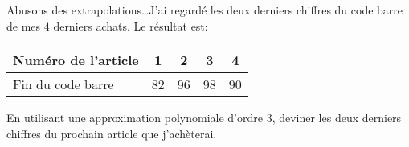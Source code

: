 \begin{exercice}\label{exotestMAT1151-G210003}

	Abusons des extrapolations\ldots J'ai regardé les deux derniers chiffres du code barre de mes $4$ derniers achats. Le résultat est:
	\begin{center}
		\begin{tabular}{|l|c|c|c|c|}
			\hline
			Numéro de l'article	 &	1	&	2	&	3	&	4\\
			\hline
			Fin du code barre	&	82	&	96	&	98	&	90\\
			\hline
		\end{tabular}
	\end{center}
	En utilisant une approximation polynomiale d'ordre $3$, deviner les deux derniers chiffres du prochain article que j'achèterai.

\end{exercice}

